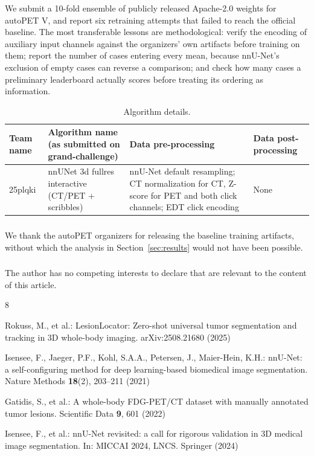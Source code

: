 \documentclass[runningheads]{llncs}
\begin{document}
We submit a 10-fold ensemble of publicly released Apache-2.0 weights for
autoPET V, and report six retraining attempts that failed to reach the official
baseline. The most transferable lessons are methodological: verify the encoding
of auxiliary input channels against the organizers' own artifacts before
training on them; report the number of cases entering every mean, because
nnU-Net's exclusion of empty cases can reverse a comparison; and check how many
cases a preliminary leaderboard actually scores before treating its ordering as
information.

\begin{table}[t]
\caption{Algorithm details.}
\label{tab:details}
\centering
\begin{tabular}{p{2.2cm}p{3.0cm}p{3.2cm}p{2.4cm}}
\toprule
Team name & Algorithm name (as submitted on grand-challenge) &
Data pre-processing & Data post-processing \\
\midrule
25plqki &
nnUNet 3d fullres interactive (CT/PET + scribbles) &
nnU-Net default resampling; CT normalization for CT, Z-score for PET and both
click channels; EDT click encoding &
None \\
\bottomrule
\end{tabular}
\end{table}

\begin{credits}
\subsubsection{\ackname} We thank the autoPET organizers for releasing the
baseline training artifacts, without which the analysis in
Section~\ref{sec:results} would not have been possible.

\subsubsection{\discintname}
The author has no competing interests to declare that are relevant to the
content of this article.
\end{credits}

\begin{thebibliography}{8}

Rokuss, M., et al.: LesionLocator: Zero-shot universal tumor segmentation and
tracking in 3D whole-body imaging. arXiv:2508.21680 (2025)

Isensee, F., Jaeger, P.F., Kohl, S.A.A., Petersen, J., Maier-Hein, K.H.:
nnU-Net: a self-configuring method for deep learning-based biomedical image
segmentation. Nature Methods \textbf{18}(2), 203--211 (2021)

Gatidis, S., et al.: A whole-body FDG-PET/CT dataset with manually annotated
tumor lesions. Scientific Data \textbf{9}, 601 (2022)

Isensee, F., et al.: nnU-Net revisited: a call for rigorous validation in 3D
medical image segmentation. In: MICCAI 2024, LNCS. Springer (2024)

\end{thebibliography}
\end{document}
